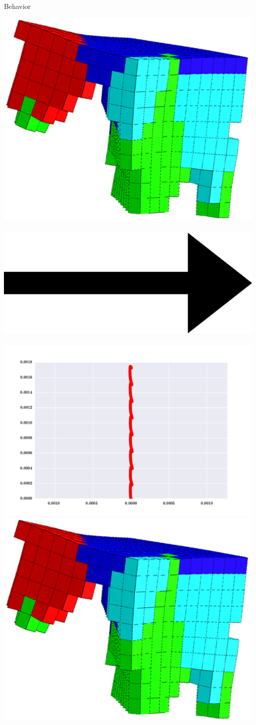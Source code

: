 \documentclass{beamer}
\begin{document}
\begin{frame}{Behavior}
\begin{center}
\includegraphics[height=0.15\textheight]{figures/unshacklingEvolutionFigure2.png}\	
\includegraphics[height=0.05\textheight]{figures/Arrow_east.eps}\	
\includegraphics[height=0.15\textwidth]{figures/behaviors/03.pdf}
\\
\includegraphics[height=0.15\textheight]{figures/unshacklingEvolutionFigure2.png}\	

\end{center}
\end{frame}
\end{document}
